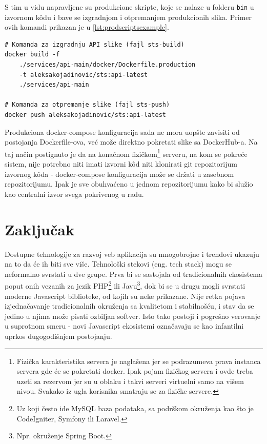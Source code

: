 \documentclass[12pt,oneside]{memoir}
\begin{document}
S tim u vidu napravljene su produkcione skripte, koje se nalaze u folderu \verb|bin| u izvornom k\^{o}du i bave se izgradnjom i otpremanjem produkcionih slika. Primer ovih komandi prikazan je u \ref{lst:prodscriptsexample}.

\begin{lstlisting}[caption={docker-compose komande.}, label={lst:prodscriptsexample}]
# Komanda za izgradnju API slike (fajl sts-build)
docker build -f 
    ./services/api-main/docker/Dockerfile.production 
    -t aleksakojadinovic/sts:api-latest 
    ./services/api-main

# Komanda za otpremanje slike (fajl sts-push)
docker push aleksakojadinovic/sts:api-latest

\end{lstlisting}

Produkciona docker-compose konfiguracija sada ne mora uopšte zavisiti od postojanja Dockerfile-ova, već može direktno pokretati slike sa DockerHub-a. Na taj način postignuto je da na konačnom fizičkom\footnote{Fizička karakteristika servera je naglašena jer se podrazumeva prava instanca servera gde će se pokretati docker. Ipak pojam fizičkog servera i ovde treba uzeti sa rezervom jer su u oblaku i takvi serveri virtuelni samo na višem nivou. Svakako iz ugla korisnika smatraju se za fizičke servere.} serveru, na kom se pokreće sistem, nije potrebno niti imati izvorni k\^{o}d niti klonirati git repozitorijum izvornog k\^{o}da - docker-compose konfiguracija može se držati u zasebnom repozitorijumu. Ipak je sve obuhvaćeno u jednom repozitorijumu kako bi služio kao centralni izvor svega pokrivenog u radu.


\chapter{Zaključak}

Dostupne tehnologije za razvoj veb aplikacija su mnogobrojne i trendovi ukazuju na to da će ih biti sve više. Tehnološki stekovi (eng. tech stack) mogu se neformalno svrstati u dve grupe. Prva bi se sastojala od tradicionalnih ekosistema poput onih vezanih za jezik PHP\footnote{Uz koji često ide MySQL baza podataka, sa podrškom okruženja kao što je CodeIgniter, Symfony ili Laravel.} ili Javu\footnote{Npr. okruženje Spring Boot.}, dok bi se u drugu mogli svrstati moderne Javascript biblioteke, od kojih su neke prikazane. Nije retka pojava izjednačavanje tradicionalnih okruženja sa kvalitetom i stabilnošću, i stav da se jedino u njima može pisati ozbiljan softver. Isto tako postoji i pogrešno verovanje u suprotnom smeru - novi Javascript ekosistemi označavaju se kao infantilni uprkos dugogodišnjem postojanju.
\end{document}

